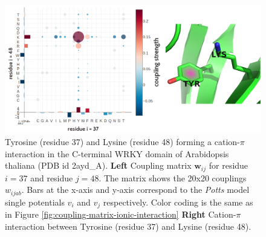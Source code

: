 \documentclass[11pt,a4paper,twoside]{book}
\newcommand{\eq}{\!=\!}
\newcommand{\vi}{v_{i}}
\newcommand{\vj}{v_{j}}
\newcommand{\wij}{\mathbf{w}_{ij}}
\newcommand{\wijab}{w_{ijab}}
\theoremstyle{definition}
\theoremstyle{definition}
\theoremstyle{remark}
\begin{document}
\begin{figure}
\includegraphics[width=1\linewidth]{img/coupling_matrix_analysis/pi_cation_interaction_combined} \caption{Tyrosine (residue 37) and
Lysine (residue 48) forming a cation-\(\pi\) interaction in the
C-terminal WRKY domain of Arabidopsis thaliana (PDB id 2ayd\_A).
\textbf{Left} Coupling matrix \(\wij\) for residue \(i\eq37\) and
residue \(j\eq48\). The matrix shows the 20x20 couplings \(\wijab\).
Bars at the x-axis and y-axis correspond to the \emph{Potts} model
single potentials \(\vi\) and \(\vj\) respectively. Color coding is the
same as in Figure \ref{fig:coupling-matrix-ionic-interaction}
\textbf{Right} Cation-\(\pi\) interaction between Tyrosine (residue 37)
and Lysine (residue 48).}\label{fig:coupling-matrix-pication-pymol}
\end{figure}
\end{document}
